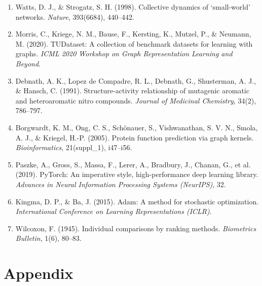 \documentclass[11pt,letterpaper]{article}
\numberwithin{equation}{section}
\numberwithin{figure}{section}
\numberwithin{table}{section}
\begin{document}
\begin{enumerate}
    \item \label{ref:wattsstrogatz} Watts, D. J., \& Strogatz, S. H. (1998). Collective dynamics of `small-world' networks. \textit{Nature}, 393(6684), 440--442.
    \item \label{ref:tudataset} Morris, C., Kriege, N. M., Bause, F., Kersting, K., Mutzel, P., \& Neumann, M. (2020). TUDataset: A collection of benchmark datasets for learning with graphs. \textit{ICML 2020 Workshop on Graph Representation Learning and Beyond}.
    \item \label{ref:mutag} Debnath, A. K., Lopez de Compadre, R. L., Debnath, G., Shusterman, A. J., \& Hansch, C. (1991). Structure-activity relationship of mutagenic aromatic and heteroaromatic nitro compounds. \textit{Journal of Medicinal Chemistry}, 34(2), 786--797.
    \item \label{ref:proteins} Borgwardt, K. M., Ong, C. S., Schönauer, S., Vishwanathan, S. V. N., Smola, A. J., \& Kriegel, H.-P. (2005). Protein function prediction via graph kernels. \textit{Bioinformatics}, 21(suppl\_1), i47--i56.
    \item \label{ref:pytorch} Paszke, A., Gross, S., Massa, F., Lerer, A., Bradbury, J., Chanan, G., et al. (2019). PyTorch: An imperative style, high-performance deep learning library. \textit{Advances in Neural Information Processing Systems (NeurIPS)}, 32.
    \item \label{ref:adam} Kingma, D. P., \& Ba, J. (2015). Adam: A method for stochastic optimization. \textit{International Conference on Learning Representations (ICLR)}.
    \item \label{ref:wilcoxon} Wilcoxon, F. (1945). Individual comparisons by ranking methods. \textit{Biometrics Bulletin}, 1(6), 80--83.
\end{enumerate}

\section*{Appendix}
\end{document}
